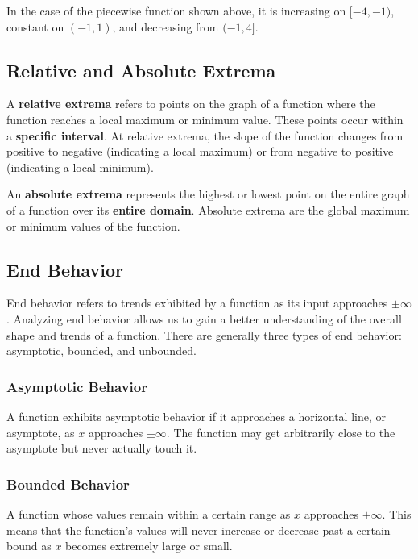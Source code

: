 \documentclass[11pt]{article}
\begin{document}
In the case of the piecewise function shown above, it is increasing on $[-4, -1)$, constant on $(-1, 1)$, and decreasing from $(-1, 4]$.

\subsection{Relative and Absolute Extrema}

A \textbf{relative extrema} refers to points on the graph of a function where the function reaches a local maximum or minimum value. These points occur within a \textbf{specific interval}. At relative extrema, the slope of the function changes from positive to negative (indicating a local maximum) or from negative to positive (indicating a local minimum).

An \textbf{absolute extrema} represents the highest or lowest point on the entire graph of a function over its \textbf{entire domain}. Absolute extrema are the global maximum or minimum values of the function. 

\subsection{End Behavior}
End behavior refers to trends exhibited by a function as its input approaches $\pm\infty$. Analyzing end behavior allows us to gain a better understanding of the overall shape and trends of a function. There are generally three types of end behavior: asymptotic, bounded, and unbounded.

\subsubsection*{Asymptotic Behavior}
A function exhibits asymptotic behavior if it approaches a horizontal line, or asymptote, as $x$ approaches $\pm\infty$. The function may get arbitrarily close to the asymptote but never actually touch it.

\begin{center}
\end{center}

\subsubsection*{Bounded Behavior}
A function whose values remain within a certain range as $x$ approaches $\pm\infty$. This means that the function's values will never increase or decrease past a certain bound as $x$ becomes extremely large or small.
\end{document}
